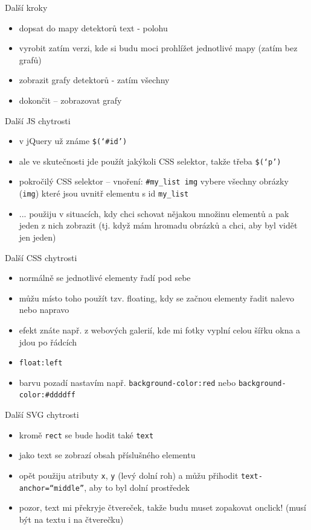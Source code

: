 \documentclass{beamer}
\begin{document}
\begin{frame}{Další kroky}
  \begin{itemize}
    \item dopsat do mapy detektorů text - polohu
    \item vyrobit zatím verzi, kde si budu moci prohlížet jednotlivé mapy (zatím bez grafů)
    \item zobrazit grafy detektorů - zatím všechny
    \item dokončit -- zobrazovat grafy
  \end{itemize}
\end{frame}

\begin{frame}{Další JS chytrosti}
  \begin{itemize}
    \item v jQuery už známe \texttt{\$(`\#id')}
    \item ale ve skutečnosti jde použít jakýkoli CSS selektor, takže třeba \texttt{\$(`p')}
    \item pokročilý CSS selektor -- vnoření: \texttt{\#my\_list img} vybere všechny obrázky (\texttt{img}) které jsou uvnitř elementu s id \texttt{my\_list}
    \item ... použiju v situacích, kdy chci schovat nějakou množinu elementů a pak jeden z nich zobrazit (tj. když mám hromadu obrázků a chci, aby byl vidět jen jeden)
  \end{itemize}
\end{frame}

\begin{frame}{Další CSS chytrosti}
  \begin{itemize}
    \item normálně se jednotlivé elementy řadí pod sebe
    \item můžu místo toho použít tzv. floating, kdy se začnou elementy řadit nalevo nebo napravo
    \item efekt znáte např. z webových galerií, kde mi fotky vyplní celou šířku okna a jdou po řádcích
    \item \texttt{float:left}
    \item barvu pozadí nastavím např. \texttt{background-color:red} nebo \texttt{background-color:\#ddddff}
  \end{itemize}
\end{frame}


\begin{frame}{Další SVG chytrosti}
  \begin{itemize}
    \item kromě \texttt{rect} se bude hodit také \texttt{text}
    \item jako text se zobrazí obsah příslušného elementu
    \item opět použiju atributy \texttt{x}, \texttt{y} (levý dolní roh) a můžu přihodit \texttt{text-anchor=``middle''}, aby to byl dolní prostředek
    \item pozor, text mi překryje čtvereček, takže budu muset zopakovat onclick! (musí být na textu i na čtverečku)
  \end{itemize}
\end{frame}
\end{document}
